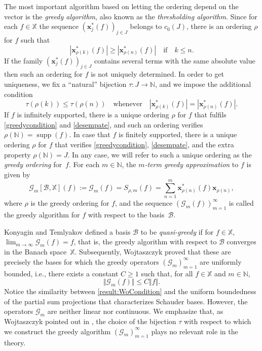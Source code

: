 \documentclass[11pt, leqno]{amsart}
\theoremstyle{remark}
\numberwithin{equation}{section}
\newcommand{\NN}{\ensuremath{\mathbb{N}}}
\newcommand{\XX}{\ensuremath{\mathbb{X}}}
\newcommand{\xx}{\ensuremath{\mathbf{x}}}
\newcommand{\BB}{\mathcal{B}}
\newcommand{\GG}{\mathcal{G}}
\newcommand{\supp}{\operatorname{supp}}
\begin{document}
The most important algorithm based on letting the ordering depend on the vector is the \textit{greedy algorithm}, also known as the
\textit{thresholding algorithm}. Since for each $f\in\XX$ the sequence $(\xx^*_j(f))_{j\in J}$ belongs to $c_0(J)$, there is an ordering $\rho$ for $f$ such that 
\begin{equation}
\label{greedycondition}
|\xx_{\rho(k)}^{\ast}(f)|\ge |\xx_{\rho(n)}^{\ast}(f)| \quad\text{if}\quad k\le n.
\end{equation}
If the family $(\xx_j^*(f))_{j\in J}$ contains several terms with the same absolute value then such an ordering for $f$ is not uniquely determined. 
In order to get uniqueness, we fix a ``natural'' bijection $\tau \colon J \to \NN$, and we impose the additional condition
\begin{equation}
\label{desempate}
\tau(\rho(k))\le\tau(\rho(n)) \quad\text{whenever}\quad |\xx_{\rho(k)}^{\ast}(f)|= |\xx_{\rho(n)}^{\ast}(f)|.
\end{equation}
If $f$ is infinitely supported, there is a unique ordering $\rho$ for $f$ that fulfils \eqref{greedycondition} and \eqref{desempate}, and such an ordering verifies $\rho(\NN)=\supp (f)$. In  case that $f$ is finitely supported, there is a unique ordering $\rho$ for $f$ that verifies \eqref{greedycondition}, \eqref{desempate}, and the extra property $\rho(\NN)=J$. In any case, we will refer to such a unique ordering as the \textit{greedy ordering} for~$f$.
For each $m\in \NN$, the \textit{$m$-term greedy approximation} to $f$
is given by
\[
  \GG_{m}[\BB, \XX](f):=\GG_{m}(f) = S_{\rho,m}(f) = \sum_{n=1}^{m}\xx_{\rho(n)}^{\ast}(f)\xx_{\rho(n)},
\]
where $\rho$ is the greedy ordering for $f$, and the sequence $(\GG_m(f))_{m=1}^\infty$ is called the greedy algorithm for $f$ with respect to the basis~$\BB$.

Konyagin and Temlyakov \cite{KonyaginTemlyakov1999} defined a basis $\BB$ to be \textit{quasi-greedy}
  if for $f\in \XX$,
$\lim_{m\to \infty}\GG_{m}(f)=f$, 
that is, the greedy algorithm with respect to  $\BB$ converges in the Banach space~$\XX$. Subsequently, Wojtaszczyk \cite{Wo2000} proved that these are precisely the bases for which the greedy operators $(\GG_m)_{m=1}^{\infty}$ are uniformly bounded, i.e., there exists a constant $C\ge 1$ such that, for all $f\in \XX$ and $m\in \NN$,
\begin{equation}
\label{result:WoCondition}
\Vert \GG_m(f)\Vert\le C \Vert f\Vert.
\end{equation}
Notice the similarity between \eqref{result:WoCondition} and the uniform boundedness  of the partial sum projections that characterizes Schauder bases.
However,  the operators $\GG_m$ are neither linear nor continuous. 
We emphasize that, as Wojtaszczyk pointed out in \cite{Wo2000}, the choice of the bijection $\tau$ with respect to which we construct the greedy algorithm $(\GG_{m})_{m=1}^{\infty}$ plays no relevant role in the theory.
\end{document}
